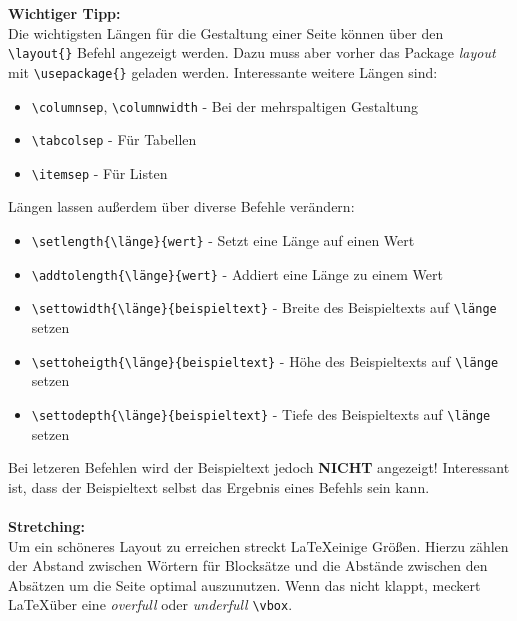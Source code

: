 \documentclass[10pt]{article}  %
\begin{document}
    \textbf{Wichtiger Tipp:}
    \\
    Die wichtigsten Längen für die Gestaltung einer Seite können über den \verb!\layout{}! Befehl angezeigt werden. Dazu muss aber vorher das Package \textsl{layout} mit \verb!\usepackage{}! geladen werden.
    Interessante weitere Längen sind:
    \begin{itemize}
        \item \verb!\columnsep!, \verb!\columnwidth! - Bei der mehrspaltigen Gestaltung
        \item \verb!\tabcolsep! - Für Tabellen
        \item \verb!\itemsep! - Für Listen
    \end{itemize}
    Längen lassen außerdem über diverse Befehle verändern:
    \begin{itemize}
        \item \verb!\setlength{\länge}{wert}! - Setzt eine Länge auf einen Wert
        \item \verb!\addtolength{\länge}{wert}! - Addiert eine Länge zu einem Wert
        \item \verb!\settowidth{\länge}{beispieltext}! - Breite des Beispieltexts auf \verb!\länge! setzen
        \item \verb!\settoheigth{\länge}{beispieltext}! - Höhe des Beispieltexts auf \verb!\länge! setzen
        \item \verb!\settodepth{\länge}{beispieltext}! - Tiefe des Beispieltexts auf \verb!\länge! setzen
    \end{itemize}
    Bei letzeren Befehlen wird der Beispieltext jedoch \textbf{NICHT} angezeigt! Interessant ist, dass der Beispieltext selbst das Ergebnis eines Befehls sein kann.
    \\
    \\
    \textbf{Stretching:}
    \\
    Um ein schöneres Layout zu erreichen streckt \LaTeX \@ einige Größen. Hierzu zählen der Abstand zwischen Wörtern für Blocksätze und die Abstände zwischen den Absätzen um die Seite optimal auszunutzen. Wenn das nicht klappt, meckert \LaTeX \@ über eine \textsl{overfull} oder \textsl{underfull} \verb!\vbox!.
\end{document}
